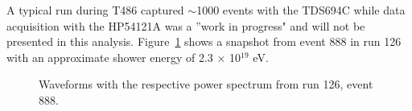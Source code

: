 \par A typical run during T486 captured $\sim$1000 events with the TDS694C while data acquisition with the HP54121A was a ''work in progress" and will not be presented in this analysis.  Figure~\ref{fig:wvfmsRun126} shows a snapshot from event 888 in run 126 with an approximate shower energy of  2.3 $\times$ 10$^{19}$ eV.

\begin{figure}[htbp]
\centering
\epsfxsize=6.2in
\caption{Waveforms with the respective power spectrum from run 126, event 888.}
\label{fig:wvfmsRun126}
\end{figure}